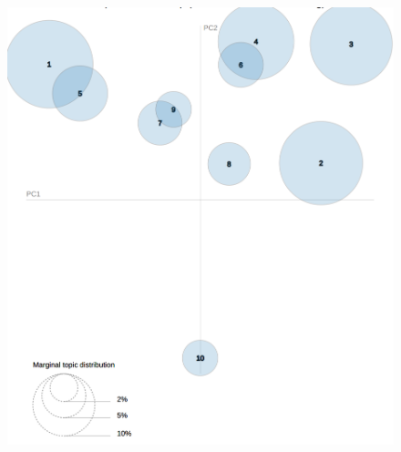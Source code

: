 \documentclass{beamer}
\begin{document}
\begin{frame}
\begin{figure}
\includegraphics[width=0.4\linewidth]{../visualizations/lda_before_visualization.png}
\end{figure}

\end{frame}
\end{document}
